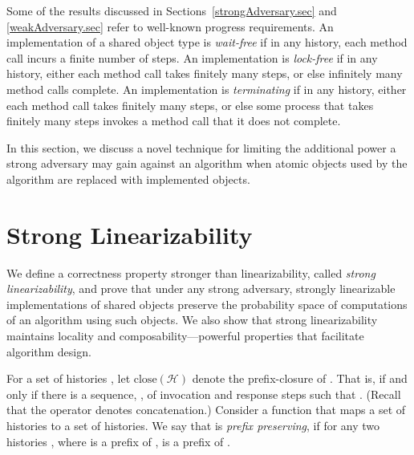 \documentclass[11pt,letterpaper]{article}
\newcommand{\HH}{\mathcal{H}}
\newcommand{\close}[1]{\ensuremath{\text{close}\left(#1\right)}}
\begin{document}
Some of the results discussed in Sections~\ref{strongAdversary.sec} and \ref{weakAdversary.sec} refer
to well-known progress requirements.
An implementation of a shared object type is \emph{wait-free} if in any history,
each method call incurs a finite number of steps.
An implementation is \emph{lock-free} if in any history, either
each method call takes finitely many steps, or else infinitely many method calls complete.
An implementation is \emph{terminating} if in any history, either
each method call takes finitely many steps, or else some process that takes finitely many
steps invokes a method call that it does not complete.



\label{strongAdversary.sec}\sloppy

In this section, we discuss a novel technique for limiting the additional power a strong adversary may gain
against an algorithm when atomic objects used by the algorithm are replaced with implemented objects.

\section{Strong Linearizability}
We define a correctness property stronger than linearizability, called \emph{strong linearizability},
and prove that under any strong adversary,
strongly linearizable implementations of shared objects preserve
the probability space of computations of an algorithm using such objects.
We also show that strong linearizability maintains
locality and composability---powerful properties that facilitate algorithm design.

For a set of histories , let \close{\HH} denote the prefix-closure of .
That is,  if and only if there is a sequence, , of invocation and response steps such that
. (Recall that the operator  denotes concatenation.)
Consider a function  that maps a set  of histories to a set  of histories.
We say that  is \emph{prefix preserving}, if for any two histories , where  is a prefix of ,  is a prefix of .
\end{document}
